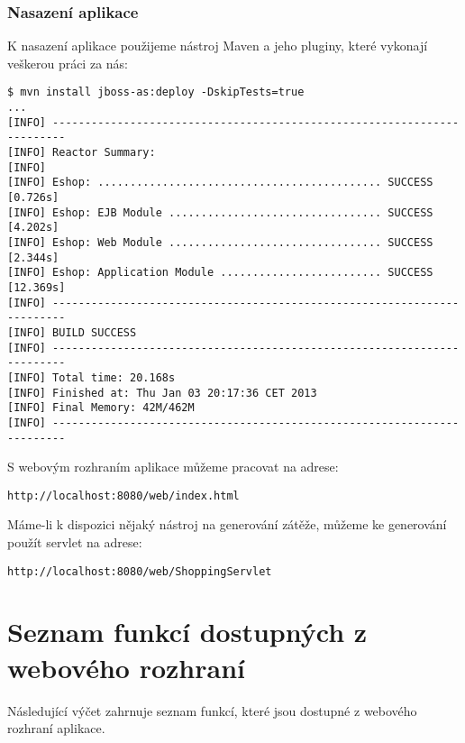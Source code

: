 \documentclass[122pt,oneside]{fithesis}
\begin{document}
\subsection{Nasazení aplikace}
K nasazení aplikace použijeme nástroj Maven a jeho pluginy, které vykonají veškerou práci za nás:
\begin{lstlisting}
$ mvn install jboss-as:deploy -DskipTests=true
...
[INFO] ------------------------------------------------------------------------
[INFO] Reactor Summary:
[INFO] 
[INFO] Eshop: ............................................ SUCCESS [0.726s]
[INFO] Eshop: EJB Module ................................. SUCCESS [4.202s]
[INFO] Eshop: Web Module ................................. SUCCESS [2.344s]
[INFO] Eshop: Application Module ......................... SUCCESS [12.369s]
[INFO] ------------------------------------------------------------------------
[INFO] BUILD SUCCESS
[INFO] ------------------------------------------------------------------------
[INFO] Total time: 20.168s
[INFO] Finished at: Thu Jan 03 20:17:36 CET 2013
[INFO] Final Memory: 42M/462M
[INFO] ------------------------------------------------------------------------
\end{lstlisting}
S webovým rozhraním aplikace můžeme pracovat na adrese:
\begin{lstlisting}
http://localhost:8080/web/index.html
\end{lstlisting}
Máme-li k dispozici nějaký nástroj na generování zátěže, můžeme ke generování použít servlet na adrese:
\begin{lstlisting}
http://localhost:8080/web/ShoppingServlet
\end{lstlisting}

\chapter{Seznam funkcí dostupných z webového rozhraní}
Následující výčet zahrnuje seznam funkcí, které jsou dostupné z webového rozhraní aplikace.\\
\end{document}
